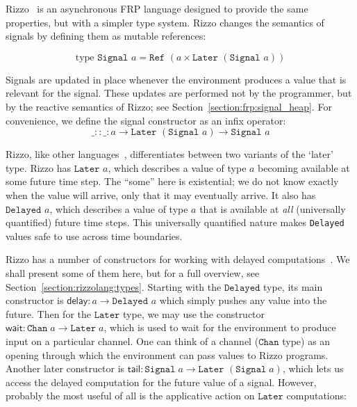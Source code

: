 Rizzo~\cite{rizzo_modal_2025} is an asynchronous FRP language designed to provide the same properties, but with a simpler type system. Rizzo changes the semantics of signals by defining them as mutable references:

\[\text{type} \texttt{ Signal }a = \texttt{Ref }(a \times \texttt{Later }(\texttt{Signal }a))\]

Signals are updated in place whenever the environment produces a value that is relevant for the signal. These updates are performed not by the programmer, but by the reactive semantics of Rizzo; see Section~\ref{section:frp:signal_heap}. For convenience, we define the signal constructor as an infix operator: 
\[\_ :: \_ : a \rightarrow \texttt{Later }(\texttt{Signal }a) \rightarrow \texttt{Signal }a\]

Rizzo, like other languages~\cite{bahr_asynchronous_2023}, differentiates between two variants of the `later' type. 
Rizzo has $\texttt{Later } a$, which describes a value of type $a$ becoming available at some future time step. The ``some'' here is existential; we do not know exactly when the value will arrive, only that it may eventually arrive.
It also has $\texttt{Delayed }a$, which describes a value of type $a$ that is available at \emph{all} (universally quantified) future time steps. This universally quantified nature makes \texttt{Delayed} values safe to use across time boundaries.


Rizzo has a number of constructors for working with delayed computations~\cite{rizzo_modal_2025}. We shall present some of them here, but for a full overview, see Section~\ref{section:rizzolang:types}.
Starting with the $\texttt{Delayed}$ type, its main constructor is $\mathsf{delay} : a \rightarrow \texttt{Delayed }a$ which simply pushes any value into the future. 
Then for the $\texttt{Later}$ type, we may use the constructor $\mathsf{wait} : \texttt{Chan}\;a \rightarrow \texttt{Later}\;a$, which is used to wait for the environment to produce input on a particular channel. One can think of a channel ($\texttt{Chan}$ type) as an opening through which the environment can pass values to Rizzo programs.
Another later constructor is $\mathsf{tail} : \texttt{Signal}\;a \rightarrow \texttt{Later }(\texttt{Signal}\;a)$, which lets us access the delayed computation for the future value of a signal. 
However, probably the most useful of all is the applicative action on $\texttt{Later}$ computations:

